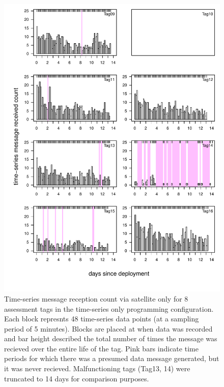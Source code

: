 \documentclass{article}
\begin{document}
\begin{figure}[h!]
\centering
\includegraphics{figure_s1.pdf}
\caption{Time-series message reception count via satellite only for 8 assessment tags in the time-series only programming configuration. Each block represnts 48 time-series data points (at a sampling period of 5 minutes). Blocks are placed at when data was recorded and bar height described the total number of times the message was recieved over the entire life of the tag. Pink bars indicate time periods for which there was a presumed data message generated, but it was never recieved. Malfunctioning tags (Tag13, 14) were truncated to 14 days for comparison purposes.}
\end{figure}
\end{document}

